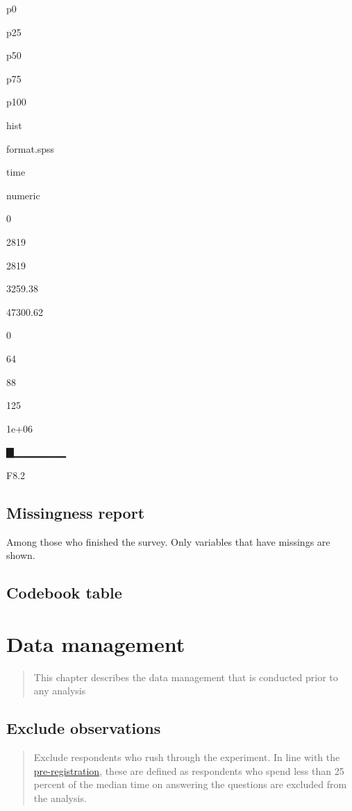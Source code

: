 \documentclass[]{book}
\begin{document}
p0

p25

p50

p75

p100

hist

format.spss

time

numeric

0

2819

2819

3259.38

47300.62

0

64

88

125

1e+06

▇▁▁▁▁▁▁▁

F8.2

\section{Missingness report}\label{missingness-report-2}

Among those who finished the survey. Only variables that have missings
are shown.

\section{Codebook table}\label{codebook-table-2}

\hypertarget{htmlwidget-f90dc8662d765986a239}{}

\chapter{Data management}\label{data-management-2}

\begin{quote}
This chapter describes the data management that is conducted prior to
any analysis
\end{quote}

\section{Exclude observations}\label{exclude-observations}

\begin{quote}
Exclude respondents who rush through the experiment. In line with the
\href{GoogLoser_Prereg_3_\#16823}{pre-registration}, these are defined
as respondents who spend less than 25 percent of the median time on
answering the questions are excluded from the analysis.
\end{quote}
\end{document}
